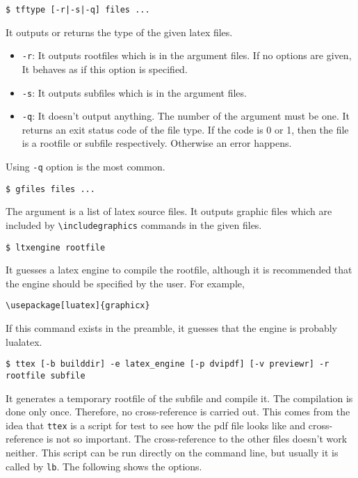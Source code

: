 \begin{verbatim}
$ tftype [-r|-s|-q] files ...
\end{verbatim}

It outputs or returns the type of the given latex files.

\begin{itemize}
\tightlist
\item
  \texttt{-r}: It outputs rootfiles which is in the argument files. If
  no options are given, It behaves as if this option is specified.
\item
  \texttt{-s}: It outputs subfiles which is in the argument files.
\item
  \texttt{-q}: It doesn't output anything. The number of the argument
  must be one. It returns an exit status code of the file type. If the
  code is 0 or 1, then the file is a rootfile or subfile respectively.
  Otherwise an error happens.
\end{itemize}

Using \texttt{-q} option is the most common.

\begin{verbatim}
$ gfiles files ...
\end{verbatim}

The argument is a list of latex source files. It outputs graphic files
which are included by \texttt{\textbackslash{}includegraphics} commands
in the given files.

\begin{verbatim}
$ ltxengine rootfile
\end{verbatim}

It guesses a latex engine to compile the rootfile, although it is
recommended that the engine should be specified by the user. For
example,

\begin{verbatim}
\usepackage[luatex]{graphicx}
\end{verbatim}

If this command exists in the preamble, it guesses that the engine is
probably lualatex.

\begin{verbatim}
$ ttex [-b builddir] -e latex_engine [-p dvipdf] [-v previewr] -r rootfile subfile
\end{verbatim}

It generates a temporary rootfile of the subfile and compile it. The
compilation is done only once. Therefore, no cross-reference is carried
out. This comes from the idea that \texttt{ttex} is a script for test to
see how the pdf file looks like and cross-reference is not so important.
The cross-reference to the other files doesn't work neither. This script
can be run directly on the command line, but usually it is called by
\texttt{lb}. The following shows the options.

